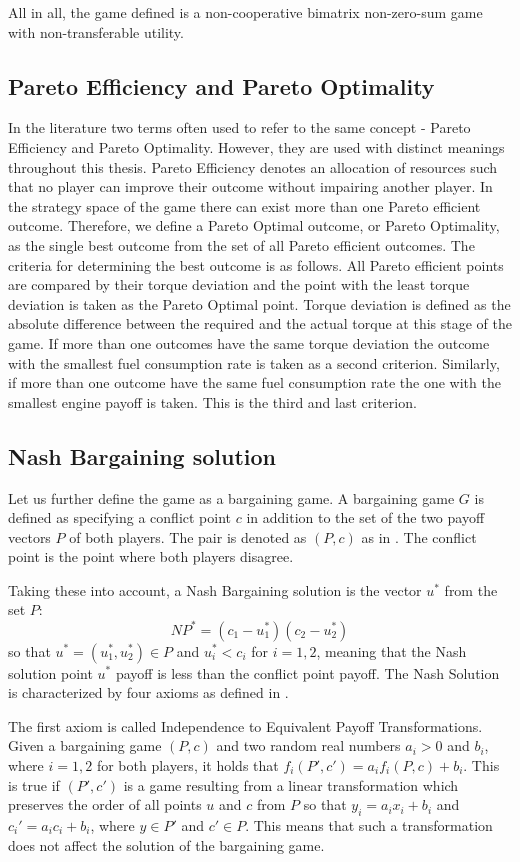 All in all, the game defined is a non-cooperative bimatrix non-zero-sum game with non-transferable utility.

\subsection{Pareto Efficiency and Pareto Optimality}
In the literature two terms often used to refer to the same concept - Pareto Efficiency and Pareto Optimality. However, they are used with distinct meanings throughout this thesis. Pareto Efficiency denotes an allocation of resources such that no player can improve their outcome without impairing another player. In the strategy space of the game there can exist more than one Pareto efficient outcome. Therefore, we define a Pareto Optimal outcome, or Pareto Optimality, as the single best outcome from the set of all Pareto efficient outcomes. The criteria for determining the best outcome is as follows. All Pareto efficient points are compared by their torque deviation and the point with the least torque deviation is taken as the Pareto Optimal point. Torque deviation is defined as the absolute difference between the required and the actual torque at this stage of the game. If more than one outcomes have the same torque deviation the outcome with the smallest fuel consumption rate is taken as a second criterion. Similarly, if more than one outcome have the same fuel consumption rate the one with the smallest engine payoff is taken. This is the third and last criterion.

\subsection{Nash Bargaining solution}
Let us further define the game as a bargaining game. A bargaining game $G$ is defined as specifying a conflict point $c$ in addition to the set of the two payoff vectors $P$ of both players. The pair is denoted as $(P,c)$ as in \citet{holler2006einfuhrung}. The conflict point is the point where both players disagree. 

Taking these into account, a Nash Bargaining solution is the vector $u^*$ from the set $P$:
\[
NP^* = (c_1 - u_1^* )(c_2 - u_2^*)
\]
so that $u^* = (u_1^*,u_2^*) \in P$ and $u_i^* < c_i$ for $i = 1,2$, meaning that the Nash solution point $u^*$ payoff is less than the conflict point payoff. The Nash Solution is characterized by four axioms as defined in \citet{holler2006einfuhrung}. 

The first axiom is called Independence to Equivalent Payoff Transformations. Given a bargaining game $(P,c)$ and two random real numbers $a_i > 0$ and $b_i$, where $i = 1,2$ for both players, it holds that $f_i(P',c') = a_i f_i(P,c) + b_i$. This is true if $(P',c')$ is a game resulting from a linear transformation which preserves the order of all points $u$ and $c$ from $P$ so that $y_i = a_i x_i + b_i$ and $c_i' = a_i c_i + b_i$, where $y \in P'$ and $c' \in P$. This means that such a transformation does not affect the solution of the bargaining game.

